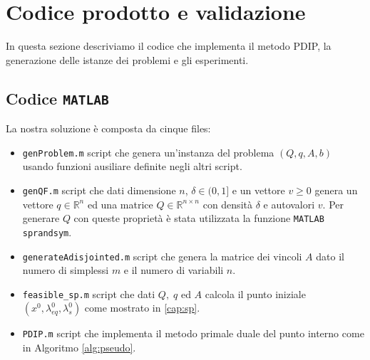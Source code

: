 
\section{Codice prodotto e validazione}
In questa sezione descriviamo il codice che implementa il metodo PDIP, la generazione delle istanze dei problemi e gli esperimenti.

\subsection{Codice \texttt{MATLAB}}
La nostra soluzione è composta da cinque files:

\begin{itemize}
    \item \texttt{genProblem.m} script che genera un'instanza del problema $(Q,q,A,b)$ usando funzioni ausiliare definite negli altri script.
    \item \texttt{genQF.m} script che dati dimensione $n$, $\delta \in (0,1]$ e un vettore $v\geq0$ genera un vettore $q\in\mathbb{R}^n$ ed una matrice $Q \in \mathbb{R}^{n \times n}$ con densità $\delta$ e autovalori $v$.
    Per generare $Q$ con queste proprietà è stata utilizzata la funzione \texttt{MATLAB} \texttt{sprandsym}.
    
   \item \texttt{generateAdisjointed.m} script che genera la matrice dei vincoli $A$ dato il numero di simplessi $m$ e il numero di variabili $n$.
    \item \texttt{feasible\_sp.m} script che dati $Q, \;q$ ed $A$ calcola il punto iniziale $(x^0, \lambda_{eq}^0, \lambda_s^0)$ come mostrato in \ref{cap:sp}.
    
    \item \texttt{PDIP.m} script che implementa il metodo primale duale del punto interno come in Algoritmo \ref{alg:pseudo}.
    
\end{itemize}


